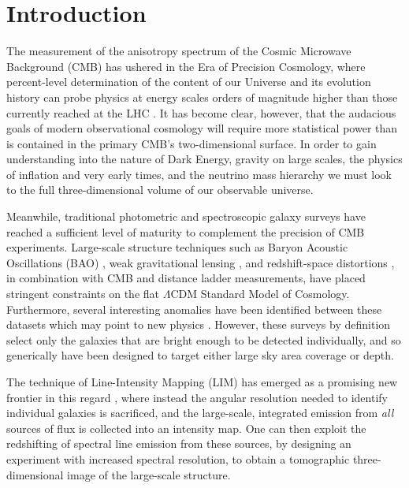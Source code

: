 \chapter{\label{chap:intro} Introduction}

The measurement of the anisotropy spectrum of the Cosmic Microwave Background (CMB) has ushered in the Era of Precision Cosmology, where percent-level determination of the content of our Universe and its evolution history can probe physics at energy scales orders of magnitude higher than those currently reached at the LHC \citep{planckcosmo, planckxbicep}. It has become clear, however, that the audacious goals of modern observational cosmology will require more statistical power than is contained in the primary CMB's two-dimensional surface. In order to gain understanding into the nature of Dark Energy, gravity on large scales, the physics of inflation and very early times, and the neutrino mass hierarchy we must look to the full three-dimensional volume of our observable universe. 

Meanwhile, traditional photometric and spectroscopic galaxy surveys have reached a sufficient level of maturity to complement the precision of CMB experiments. Large-scale structure techniques such as Baryon Acoustic Oscillations (BAO) \citep{boss}, weak gravitational lensing \citep{cfhtlens, kids450}, and redshift-space distortions \citep{rsd}, in combination with CMB and distance ladder measurements, have placed stringent constraints on the flat $\Lambda$CDM Standard Model of Cosmology. Furthermore, several interesting anomalies have been identified between these datasets which may point to new physics \citep{planckcosmo, h0}. However, these surveys by definition select only the galaxies that are bright enough to be detected individually, and so generically have been designed to target either large sky area coverage or depth.

The technique of Line-Intensity Mapping (LIM) has emerged as a promising new frontier in this regard \citep{statusreport}, where instead the angular resolution needed to identify individual galaxies is sacrificed, and the large-scale, integrated emission from \textit{all} sources of flux is collected into an intensity map. One can then exploit the redshifting of spectral line emission from these sources, by designing an experiment with increased spectral resolution, to obtain a tomographic three-dimensional image of the large-scale structure.

